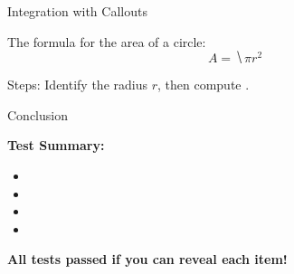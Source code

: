 \documentclass{beamer}
\begin{document}
\begin{frame}{Integration with Callouts}


The formula for the area of a circle:
\[
  A = \hide{\pi r^2}
\]


Steps: Identify the radius $r$, then compute .

\end{frame}

\begin{frame}{Conclusion}

\textbf{Test Summary:}

\begin{itemize}
  \item {}
  \item {}
  \item {}
  \item {}
\end{itemize}

\bigskip
\textbf{All tests passed if you can reveal each item!}

\end{frame}
\end{document}
